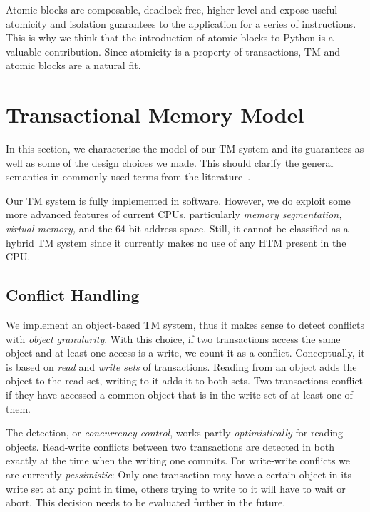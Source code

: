 \documentclass{sigplanconf}
\begin{document}
Atomic blocks are composable, deadlock-free, higher-level and expose
useful atomicity and isolation guarantees to the application for a
series of instructions. This is why we think that the introduction
of atomic blocks to Python is a valuable contribution. Since atomicity
is a property of transactions, TM and atomic blocks are a natural fit.



\section{Transactional Memory Model}

In this section, we characterise the model of our TM system and its
guarantees as well as some of the design choices we made. This should
clarify the general semantics in commonly used terms from the
literature~\cite{harris10}.

Our TM system is fully implemented in software. However, we do exploit
some more advanced features of current CPUs, particularly \emph{memory
segmentation, virtual memory,} and the 64-bit address space. Still,
it cannot be classified as a hybrid TM system since it currently
makes no use of any HTM present in the CPU.

\subsection{Conflict Handling}

We implement an object-based TM system, thus it makes sense to detect
conflicts with \emph{object granularity}. With this choice, if two
transactions access the same object and at least one access is a
write, we count it as a conflict. Conceptually, it is based on
\emph{read} and \emph{write sets} of transactions. Reading from an
object adds the object to the read set, writing to it adds it to both
sets. Two transactions conflict if they have accessed a common object
that is in the write set of at least one of them.

The detection, or \emph{concurrency control}, works partly
\emph{optimistically} for reading objects. Read-write conflicts
between two transactions are detected in both exactly at the time when
the writing one commits. For write-write conflicts we are currently
\emph{pessimistic}: Only one transaction may have a certain object in
its write set at any point in time, others trying to write to it will
have to wait or abort. This decision needs to be evaluated further
in the future.
\end{document}
